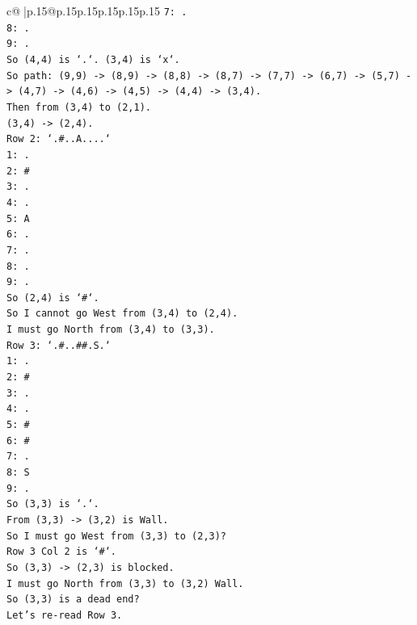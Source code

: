 \documentclass{article}
\begin{document}
{\begin{supertabular}{c@{$\;$}|p{.15\linewidth}@{}p{.15\linewidth}p{.15\linewidth}p{.15\linewidth}p{.15\linewidth}p{.15\linewidth}}
{{{\texttt{7: .} \\
\texttt{8: .} \\
\texttt{9: .} \\
\texttt{So (4,4) is `.`. (3,4) is `x`.} \\
\texttt{So path: (9,9) {-}> (8,9) {-}> (8,8) {-}> (8,7) {-}> (7,7) {-}> (6,7) {-}> (5,7) {-}> (4,7) {-}> (4,6) {-}> (4,5) {-}> (4,4) {-}> (3,4).} \\
\texttt{Then from (3,4) to (2,1).} \\
\texttt{(3,4) {-}> (2,4).} \\
\texttt{Row 2: `.\#..A....`} \\
\texttt{1: .} \\
\texttt{2: \#} \\
\texttt{3: .} \\
\texttt{4: .} \\
\texttt{5: A} \\
\texttt{6: .} \\
\texttt{7: .} \\
\texttt{8: .} \\
\texttt{9: .} \\
\texttt{So (2,4) is `\#`.} \\
\texttt{So I cannot go West from (3,4) to (2,4).} \\
\texttt{I must go North from (3,4) to (3,3).} \\
\texttt{Row 3: `.\#..\#\#.S.`} \\
\texttt{1: .} \\
\texttt{2: \#} \\
\texttt{3: .} \\
\texttt{4: .} \\
\texttt{5: \#} \\
\texttt{6: \#} \\
\texttt{7: .} \\
\texttt{8: S} \\
\texttt{9: .} \\
\texttt{So (3,3) is `.`.} \\
\texttt{From (3,3) {-}> (3,2) is Wall.} \\
\texttt{So I must go West from (3,3) to (2,3)?} \\
\texttt{Row 3 Col 2 is `\#`.} \\
\texttt{So (3,3) {-}> (2,3) is blocked.} \\
\texttt{I must go North from (3,3) to (3,2) Wall.} \\
\texttt{So (3,3) is a dead end?} \\
\texttt{Let's re{-}read Row 3.} \\
}}}
\end{supertabular}}
\end{document}
